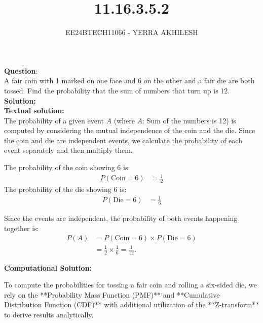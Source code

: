 \documentclass[journal]{IEEEtran}
\begin{document}

\vspace{3cm}

\title{11.16.3.5.2}
\author{EE24BTECH11066 - YERRA AKHILESH}
{\let\newpage\relax\maketitle}

\renewcommand{\thefigure}{\theenumi}
\renewcommand{\thetable}{\theenumi}
\setlength{\intextsep}{10pt} %

\renewcommand{\thetable}{\theenumi}

\textbf{Question}:\\ 

A fair coin with 1 marked on one face and 6 on the other and a fair die are both tossed. Find the probability that the sum of numbers that turn up is 12.\\

\textbf{Solution: }\\
\textbf{Textual solution: }\\
The probability of a given event $A$ (where $A$: Sum of the numbers is 12) is computed by considering the mutual independence of the coin and the die. Since the coin and die are independent events, we calculate the probability of each event separately and then multiply them.

The probability of the coin showing 6 is:
\begin{align}
P(\text{Coin} = 6) &= \frac{1}{2}
\end{align}
The probability of the die showing 6 is:
\begin{align}
P(\text{Die} = 6) &= \frac{1}{6}
\end{align}

Since the events are independent, the probability of both events happening together is:
\begin{align}
P(A) &= P(\text{Coin} = 6) \times P(\text{Die} = 6) \\
     &= \frac{1}{2} \times \frac{1}{6} = \frac{1}{12}.
\end{align}

\textbf{Computational Solution:}


To compute the probabilities for tossing a fair coin and rolling a six-sided die, we rely on the **Probability Mass Function (PMF)** and **Cumulative Distribution Function (CDF)** with additional utilization of the **Z-transform** to derive results analytically.
\end{document}
